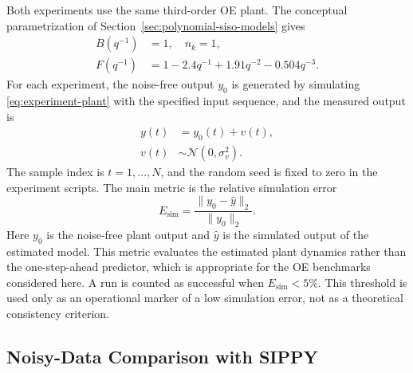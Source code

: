 \documentclass{ifacconf}
\begin{document}
Both experiments use the same third-order OE plant.  The conceptual
parametrization of Section~\ref{sec:polynomial-siso-models} gives
\begin{equation}
  \begin{aligned}
    B(q^{-1}) &= 1, \quad n_k = 1, \\
    F(q^{-1}) &= 1-2.4q^{-1}+1.91q^{-2}-0.504q^{-3}.
  \end{aligned}
  \label{eq:experiment-plant}
\end{equation}
For each experiment, the noise-free output \(y_0\) is generated by simulating
\eqref{eq:experiment-plant} with the specified input sequence, and the measured
output is
\begin{align}
  y(t) &= y_0(t)+v(t), \\
  v(t) &\sim \mathcal{N}(0,\sigma_v^2).
  \label{eq:experiment-noise}
\end{align}
The sample index is \(t=1,\ldots,N\), and the random seed is fixed to zero in
the experiment scripts.
The main metric is the relative simulation error
\begin{equation}
  E_{\mathrm{sim}} = \frac{\lVert y_0 - \hat y\rVert_2}{\lVert y_0\rVert_2}.
  \label{eq:simulation-error}
\end{equation}
Here \(y_0\) is the noise-free plant output and \(\hat y\) is the simulated
output of the estimated model.  This metric evaluates the estimated plant
dynamics rather than the one-step-ahead predictor, which is appropriate for the
OE benchmarks considered here.  A run is counted as successful when
\(E_{\mathrm{sim}}<5\%\).  This threshold is used only as an operational marker
of a low simulation error, not as a theoretical consistency criterion.

\subsection{Noisy-Data Comparison with SIPPY}
\label{subsec:noisy-data-sippy}
\end{document}
